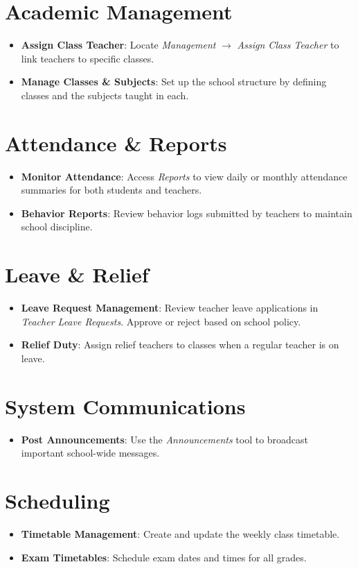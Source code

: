 \documentclass[12pt, a4paper]{report}
\begin{document}
\section{Academic Management}
\begin{itemize}
    \item \textbf{Assign Class Teacher}: Locate \textit{Management} $\rightarrow$ \textit{Assign Class Teacher} to link teachers to specific classes.
    \item \textbf{Manage Classes \& Subjects}: Set up the school structure by defining classes and the subjects taught in each.
\end{itemize}

\section{Attendance \& Reports}
\begin{itemize}
    \item \textbf{Monitor Attendance}: Access \textit{Reports} to view daily or monthly attendance summaries for both students and teachers.
    \item \textbf{Behavior Reports}: Review behavior logs submitted by teachers to maintain school discipline.
\end{itemize}

\section{Leave \& Relief}
\begin{itemize}
    \item \textbf{Leave Request Management}: Review teacher leave applications in \textit{Teacher Leave Requests}. Approve or reject based on school policy.
    \item \textbf{Relief Duty}: Assign relief teachers to classes when a regular teacher is on leave.
\end{itemize}

\section{System Communications}
\begin{itemize}
    \item \textbf{Post Announcements}: Use the \textit{Announcements} tool to broadcast important school-wide messages.
\end{itemize}

\section{Scheduling}
\begin{itemize}
    \item \textbf{Timetable Management}: Create and update the weekly class timetable.
    \item \textbf{Exam Timetables}: Schedule exam dates and times for all grades.
\end{itemize}
\end{document}
